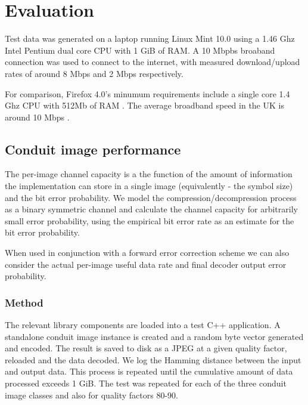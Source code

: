 \chapter{Evaluation}\label{ch:evaluation}

Test data was generated on a laptop running Linux Mint 10.0 using a 1.46 Ghz Intel Pentium dual core CPU with 1 GiB of RAM. A 10 Mbpbs broaband connection was used to connect to the internet, with measured download/upload rates of around 8 Mbps and 2 Mbps respectively.

For comparison, Firefox 4.0's minumum requirements include a single core 1.4 Ghz CPU with 512Mb of RAM \cite{firefox-req}. The average broadband speed in the UK is around 10 Mbps \cite{bband-stats}. 



\section{Conduit image performance}

The per-image channel capacity is a the function of the amount of information the implementation can store in a single image (equivalently - the symbol size) and the bit error probability. We model the compression/decompression process as a binary symmetric channel and calculate the channel capacity for arbitrarily small error probability, using the empirical bit error rate as an estimate for the bit error probability.

When used in conjunction with a forward error correction scheme we can also consider the actual per-image useful data rate and final decoder output error probability.


\subsection{Method}

The relevant library components are loaded into a test C++ application. A standalone conduit image instance is created and a random byte vector generated and encoded. The result is saved to disk as a JPEG at a given quality factor, reloaded and the data decoded. We log the Hamming distance between the input and output data. This process is repeated until the cumulative amount of data processed exceeds 1 GiB. The test was repeated for each of the three conduit image classes and also for quality factors 80-90.

